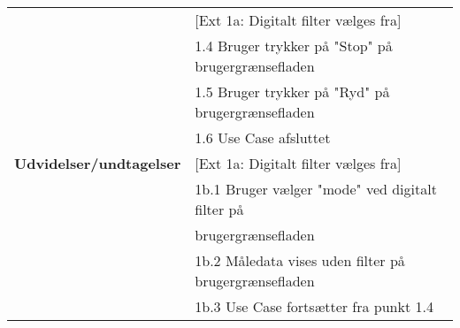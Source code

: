 \begin{table}[h!]
\begin{tabular}{l|l}
		& {[}Ext 1a: Digitalt filter vælges fra{]} \\
		& 1.4 Bruger trykker på "Stop" på brugergrænsefladen \\
		& 1.5 Bruger trykker på "Ryd" på brugergrænsefladen \\
		& 1.6 Use Case afsluttet \\ \hline
		\rowcolor[HTML]{A9D9F9} 
		\textbf{Udvidelser/undtagelser} 
		& {[}Ext 1a: Digitalt filter vælges fra{]} \\
		\rowcolor[HTML]{A9D9F9} 
		& 1b.1 Bruger vælger "mode" ved digitalt filter på \\
		\rowcolor[HTML]{A9D9F9} 
		& brugergrænsefladen \\
		\rowcolor[HTML]{A9D9F9} 
		& 1b.2 Måledata vises uden filter på brugergrænsefladen \\
		\rowcolor[HTML]{A9D9F9} 
		& 1b.3 Use Case fortsætter fra punkt 1.4
	\end{tabular}
\end{table}